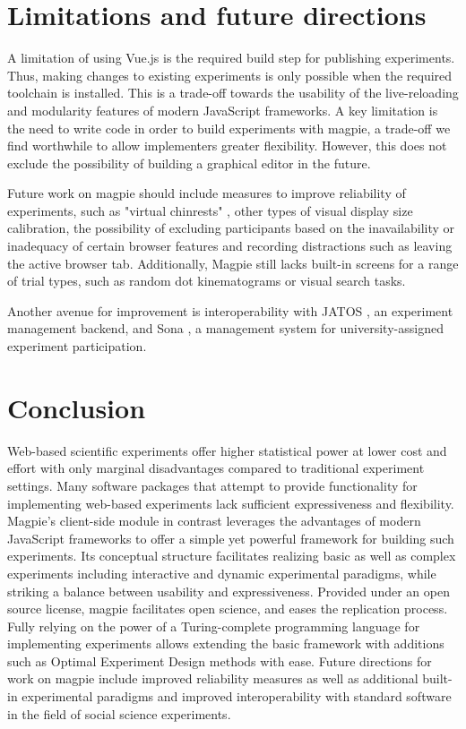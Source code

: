 \documentclass[a4paper,11pt]{scrreprt}
\begin{document}
\chapter{Limitations and future directions}
A limitation of using Vue.js is the required build step for publishing experiments. Thus, making changes to existing experiments is only possible when the required toolchain is installed. This is a trade-off towards the usability of the live-reloading and modularity features of modern JavaScript frameworks. A key limitation is the need to write code in order to build experiments with magpie, a trade-off we find worthwhile to allow implementers greater flexibility. However, this does not exclude the possibility of building a graphical editor in the future.

Future work on magpie should include measures to improve reliability of experiments, such as "virtual chinrests" \citep{Li2020}, other types of visual display size calibration, the possibility of excluding participants based on the inavailability or inadequacy of certain browser features and recording distractions such as leaving the active browser tab. Additionally, Magpie still lacks built-in screens for a range of trial types, such as random dot kinematograms or visual search tasks.

Another avenue for improvement is interoperability with JATOS \citep{Lange2015}, an experiment management backend, and Sona \citep{SonaSystems2002}, a management system for university-assigned experiment participation.

\chapter{Conclusion}
Web-based scientific experiments offer higher statistical power at lower cost and effort with only marginal disadvantages compared to traditional experiment settings. Many software packages that attempt to provide functionality for implementing web-based experiments lack sufficient expressiveness and flexibility. Magpie's client-side module in contrast leverages the advantages of modern JavaScript frameworks to offer a simple yet powerful framework for building such experiments. Its conceptual structure facilitates realizing basic as well as complex experiments including interactive and dynamic experimental paradigms, while striking a balance between usability and expressiveness. Provided under an open source license, magpie facilitates open science, and eases the replication process. Fully relying on the power of a Turing-complete programming language for implementing experiments allows extending the basic framework with additions such as Optimal Experiment Design methods with ease. Future directions for work on magpie include improved reliability measures as well as additional built-in experimental paradigms and improved interoperability with standard software in the field of social science experiments.

\newpage 
 

\end{document}

